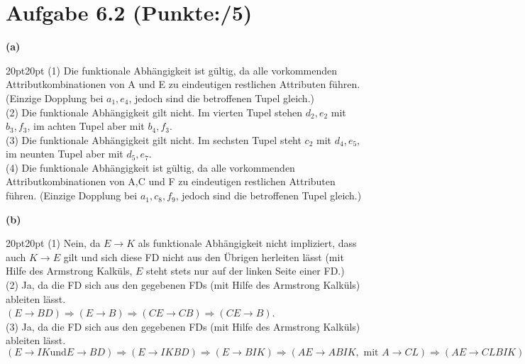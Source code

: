\documentclass[11pt, a4paper]{article}
\newcommand{\blattnummer}{6}
\newcommand{\pp}{5}
\newcommand{\aufgabe}[2] {\section*{Aufgabe \blattnummer.#1 (Punkte:\qquad/#2)}}
\newcommand{\aufgabenteil}[1] {\textbf{(#1)}}
\begin{document}
\aufgabe{2}{\pp}
\aufgabenteil{a}
\begin{adjustwidth}{20pt}{20pt}
    (1) Die funktionale Abhängigkeit ist gültig, da alle vorkommenden Attributkombinationen von A und E zu eindeutigen restlichen Attributen führen. (Einzige Dopplung
        bei $a_1,e_4$, jedoch sind die betroffenen Tupel gleich.) \\
    (2) Die funktionale Abhängigkeit gilt nicht. Im vierten Tupel stehen $d_2,e_2$ mit $b_3,f_3$, im achten Tupel aber mit $b_4,f_3$. \\
    (3) Die funktionale Abhängigkeit gilt nicht. Im sechsten Tupel steht $c_2$ mit $d_4, e_5$, im neunten Tupel aber mit $d_5, e_7$.\\
    (4) Die funktionale Abhängigkeit ist gültig, da alle vorkommenden Attributkombinationen von A,C und F zu eindeutigen restlichen Attributen führen. (Einzige Dopplung
        bei $a_1,c_8,f_9$, jedoch sind die betroffenen Tupel gleich.)
\end{adjustwidth}
\aufgabenteil{b}
\begin{adjustwidth}{20pt}{20pt}
	(1) Nein, da $E \rightarrow K$ als funktionale Abhängigkeit nicht impliziert, dass auch $K \rightarrow E$ gilt und sich diese FD nicht aus den Übrigen herleiten lässt (mit Hilfe des
	Armstrong Kalküls, $E$ steht stets nur auf der linken Seite einer FD.) \\
	(2) Ja, da die FD sich aus den gegebenen FDs (mit Hilfe des Armstrong Kalküls) ableiten lässt. \\ \indent$(E \rightarrow BD) \Rightarrow (E \rightarrow B) \Rightarrow (CE \rightarrow CB)
	\Rightarrow (CE \rightarrow B)$. \\
	(3) Ja, da die FD sich aus den gegebenen FDs (mit Hilfe des Armstrong Kalküls) ableiten lässt. \\ \indent$(E \rightarrow IK \text{und} E \rightarrow BD) \Rightarrow
	(E \rightarrow IKBD) \Rightarrow (E \rightarrow BIK) \Rightarrow (AE \rightarrow ABIK, \text{ mit } A \rightarrow CL) \Rightarrow (AE \rightarrow CLBIK) \Rightarrow
	(AEL \rightarrow CLBIK) \Rightarrow (AEL \rightarrow BCIK).$
\end{adjustwidth}
\end{document}
